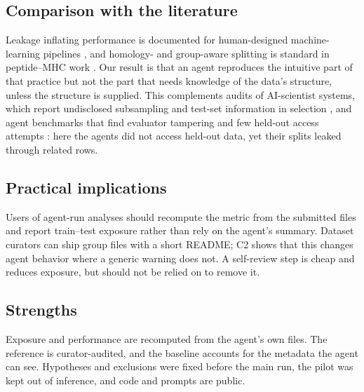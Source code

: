 \documentclass[11pt,a4paper]{article}
\begin{document}
\subsection*{Comparison with the literature}
Leakage inflating performance is documented for human-designed machine-learning pipelines \cite{Kapoor2023}, and homology- and group-aware splitting is standard in peptide--MHC work \cite{Reynisson2020}. Our result is that an agent reproduces the intuitive part of that practice but not the part that needs knowledge of the data's structure, unless the structure is supplied. This complements audits of AI-scientist systems, which report undisclosed subsampling and test-set information in selection \cite{Luo2025}, and agent benchmarks that find evaluator tampering and few held-out access attempts \cite{Atinafu2026}: here the agents did not access held-out data, yet their splits leaked through related rows.

\subsection*{Practical implications}
Users of agent-run analyses should recompute the metric from the submitted files and report train--test exposure rather than rely on the agent's summary. Dataset curators can ship group files with a short README; C2 shows that this changes agent behavior where a generic warning does not. A self-review step is cheap and reduces exposure, but should not be relied on to remove it.

\subsection*{Strengths}
Exposure and performance are recomputed from the agent's own files. The reference is curator-audited, and the baseline accounts for the metadata the agent can see. Hypotheses and exclusions were fixed before the main run, the pilot was kept out of inference, and code and prompts are public.
\end{document}
